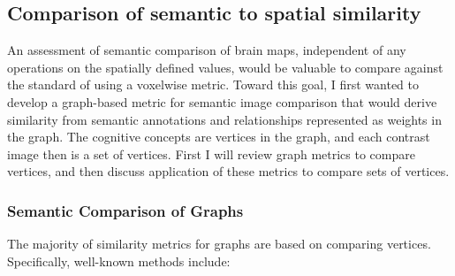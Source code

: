 \documentclass{report}
\begin{document}
\subsection{Comparison of semantic to spatial similarity}

An assessment of semantic comparison of brain maps, independent of any
operations on the spatially defined values, would be valuable to compare
against the standard of using a voxelwise metric. Toward this goal, I
first wanted to develop a graph-based metric for semantic image
comparison that would derive similarity from semantic annotations and
relationships represented as weights in the graph. The cognitive concepts are vertices in the graph, and each contrast image then is a set of vertices. First I will review graph metrics to compare vertices, and then discuss  application of these metrics to compare sets of vertices.

\subsubsection{Semantic Comparison of Graphs}
The majority of similarity metrics for graphs are based on comparing vertices. Specifically, well-known methods include:
\end{document}
